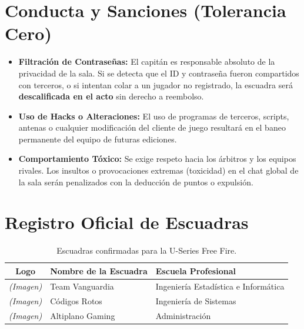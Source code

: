 \documentclass[11pt, a4paper]{article}
\begin{document}
\section{Conducta y Sanciones (Tolerancia Cero)}
\begin{itemize}
    \item \textbf{Filtración de Contraseñas:} El capitán es responsable absoluto de la privacidad de la sala. Si se detecta que el ID y contraseña fueron compartidos con terceros, o si intentan colar a un jugador no registrado, la escuadra será \textbf{descalificada en el acto} sin derecho a reembolso.
    \item \textbf{Uso de Hacks o Alteraciones:} El uso de programas de terceros, scripts, antenas o cualquier modificación del cliente de juego resultará en el baneo permanente del equipo de futuras ediciones.
    \item \textbf{Comportamiento Tóxico:} Se exige respeto hacia los árbitros y los equipos rivales. Los insultos o provocaciones extremas (toxicidad) en el chat global de la sala serán penalizados con la deducción de puntos o expulsión.
\end{itemize}

\section{Registro Oficial de Escuadras}
\vspace{0.5cm}

\begin{table}[htpb]
    \centering
    \renewcommand{\arraystretch}{1.5}
    \begin{tabular}{|c|p{4cm}|p{6cm}|}
        \hline
        \textbf{Logo} & \textbf{Nombre de la Escuadra} & \textbf{Escuela Profesional} \\
        \hline
        \textit{(Imagen)} & Team Vanguardia & Ingeniería Estadística e Informática \\
        \hline
        \textit{(Imagen)} & Códigos Rotos & Ingeniería de Sistemas \\
        \hline
        \textit{(Imagen)} & Altiplano Gaming & Administración \\
        \hline
    \end{tabular}
    \caption{Escuadras confirmadas para la U-Series Free Fire.}
\end{table}
\end{document}
